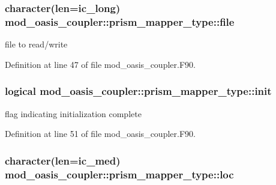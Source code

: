 \hypertarget{structmod__oasis__coupler_1_1prism__mapper__type_a4994b8d9101eac292d85a5e0447cdeec}{
\subsubsection[{file}]{\setlength{\rightskip}{0pt plus 5cm}character(len=ic\+\_\+long) mod\+\_\+oasis\+\_\+coupler\+::prism\+\_\+mapper\+\_\+type\+::file\hspace{0.3cm}{\ttfamily [private]}}}\label{structmod__oasis__coupler_1_1prism__mapper__type_a4994b8d9101eac292d85a5e0447cdeec}


file to read/write 



Definition at line 47 of file mod\+\_\+oasis\+\_\+coupler.\+F90.

\hypertarget{structmod__oasis__coupler_1_1prism__mapper__type_aa558dfa65125e50c062b519b68d89ba1}{
\subsubsection[{init}]{\setlength{\rightskip}{0pt plus 5cm}logical mod\+\_\+oasis\+\_\+coupler\+::prism\+\_\+mapper\+\_\+type\+::init\hspace{0.3cm}{\ttfamily [private]}}}\label{structmod__oasis__coupler_1_1prism__mapper__type_aa558dfa65125e50c062b519b68d89ba1}


flag indicating initialization complete 



Definition at line 51 of file mod\+\_\+oasis\+\_\+coupler.\+F90.

\hypertarget{structmod__oasis__coupler_1_1prism__mapper__type_a23c2df7387be68804d75095c47e59b69}{
\subsubsection[{loc}]{\setlength{\rightskip}{0pt plus 5cm}character(len=ic\+\_\+med) mod\+\_\+oasis\+\_\+coupler\+::prism\+\_\+mapper\+\_\+type\+::loc\hspace{0.3cm}{\ttfamily [private]}}}\label{structmod__oasis__coupler_1_1prism__mapper__type_a23c2df7387be68804d75095c47e59b69}


